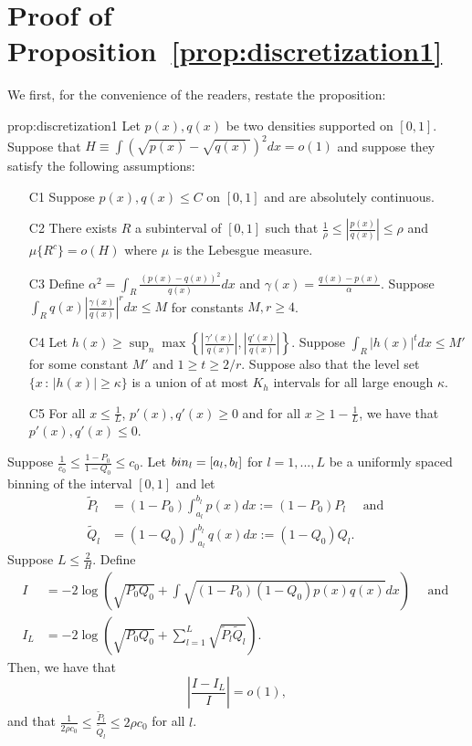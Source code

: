 \documentclass{article}
\newcommand{\bin}{\text{bin}}
\begin{document}
\section{Proof of Proposition~\ref{prop:discretization1}}

We first, for the convenience of the readers, restate the proposition:

\begin{repproposition} {prop:discretization1}
Let $p(x), q(x)$ be two densities supported on $[0,1]$. Suppose that $H \equiv \int (\sqrt{p(x)} - \sqrt{q(x)})^2 dx = o(1)$ and suppose they satisfy the following assumptions:
\begin{enumerate}
\item[C1] Suppose $p(x), q(x) \leq C$ on $[0,1]$ and are absolutely continuous.
\item[C2] There exists $R$ a subinterval of $[0,1]$ such that $\frac{1}{\rho} \leq \left| \frac{p(x)}{q(x)} \right| \leq \rho$ and $\mu\{R^c\} = o(H)$ where $\mu$ is the Lebesgue measure.
\item[C3] Define $\alpha^2 = \int_R \frac{(p(x) - q(x))^2}{q(x)} dx$ and $\gamma(x) = \frac{q(x) - p(x)}{\alpha}$. Suppose $\int_R q(x) \left| \frac{\gamma(x)}{q(x)} \right|^r dx  \leq M$ for constants $M, r \geq 4$.
\item[C4] Let $h(x) \geq \sup_n \max \left\{  \left|\frac{\gamma'(x)}{q(x)} \right|, 
 \left|\frac{q'(x)}{q(x)}\right|  \right\} $. Suppose $\int_R |h(x)|^t dx \leq M'$ for some constant $M'$ and $1 \geq t \geq 2/r$. Suppose also that the level set $\{x \,:\, |h(x)| \geq \kappa\}$ is a union of at most $K_h$ intervals for all large enough $\kappa$.  
\item[C5] For all $x \leq \frac{1}{L}$, $p'(x), q'(x) \geq 0$ and for all $x \geq 1 - \frac{1}{L}$, we have that $p'(x), q'(x) \leq 0$.
\end{enumerate}
Suppose $\frac{1}{c_0} \leq \frac{1 - P_0}{1-Q_0} \leq c_0$. Let $\\bin_l = [a_l, b_l]$ for $l=1,...,L$ be a uniformly spaced binning of the interval $[0,1]$ and let
\begin{align*}
\tilde P_l &= (1- P_0) \int_{a_l}^{b_l} p(x) dx := (1-P_0) P_l\quad \text{ and }\\
\tilde Q_l &= (1-Q_0)\int_{a_l}^{b_l} q(x) dx := (1-Q_0) Q_l.
\end{align*}
Suppose $L \leq \frac{2}{H}$. Define 
\begin{align*}
I &= -2 \log \left( \sqrt{P_0 Q_0} + \int \sqrt{(1-P_0)(1-Q_0) p(x) q(x)} dx \right) \quad \text{ and }\\
I_L &= -2 \log \left( \sqrt{P_0 Q_0} + \sum_{l=1}^L \sqrt{\tilde P_l \tilde Q_l} \right).
\end{align*}
Then, we have that
 $$\left| \frac{I - I_L}{I} \right| = o(1),$$ 
and that $\frac{1}{2\rho c_0} \leq \frac{\tilde P_l}{\tilde Q_l} \leq 2\rho c_0$ for all $l$. 
\end{repproposition}
\end{document}
